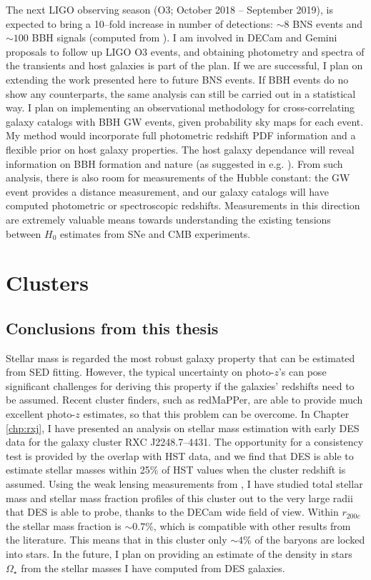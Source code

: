 The next LIGO observing season (O3; October 2018 -- September 2019), is expected to bring a 10--fold increase in number of detections: $\sim 8$ BNS events and $\sim 100$ BBH signals (computed from \citealt{2017arXiv170908079C}). I am involved in DECam and Gemini proposals to follow up LIGO O3 events, and obtaining photometry and spectra of the transients and host galaxies is part of the plan. If we are successful, I plan on extending the work presented here to future BNS events. If BBH events do no show any counterparts, the same analysis can still be carried out in a statistical way. I plan on implementing an observational methodology for cross-correlating galaxy catalogs with BBH GW events, given probability sky maps for each event. My method would incorporate full photometric redshift PDF information and a flexible prior on host galaxy properties. The host galaxy dependance will reveal information on BBH formation and nature (as suggested in e.g. \citealt{raccanelli}). From such analysis, there is also room for measurements of the Hubble constant: the GW event provides a distance measurement, and our galaxy catalogs will have computed photometric or spectroscopic redshifts. Measurements in this direction are extremely valuable means towards understanding the existing tensions between $H_0$ estimates from SNe and CMB experiments.

\section{Clusters}

\subsection{Conclusions from this thesis}
Stellar mass is regarded the most robust galaxy property that can be estimated from SED fitting. However, the typical uncertainty on photo-$z$'s can pose significant challenges for deriving this property if the galaxies' redshifts need to be assumed. Recent cluster finders, such as redMaPPer, are able to provide much excellent photo-$z$ estimates, so that this problem can be overcome. In Chapter \ref{chp:rxj}, I have presented an analysis on stellar mass estimation with early DES data for the galaxy cluster RXC J2248.7--4431. The opportunity for a consistency test is provided by the overlap with HST data, and we find that DES is able to estimate stellar masses within 25\% of HST values when the cluster redshift is assumed. Using the weak lensing measurements from \citet{melchior}, I have studied total stellar mass and stellar mass fraction profiles of this cluster out to the very large radii that DES is able to probe, thanks to the DECam wide field of view. Within $r_{200c}$ the stellar mass fraction is $\sim 0.7\%$, which is compatible with other results from the literature. This means that in this cluster only $\sim 4\%$ of the baryons are locked into stars. In the future, I plan on providing an estimate of the density in stars $\Omega_\star$ from the stellar masses I have computed from DES galaxies.

